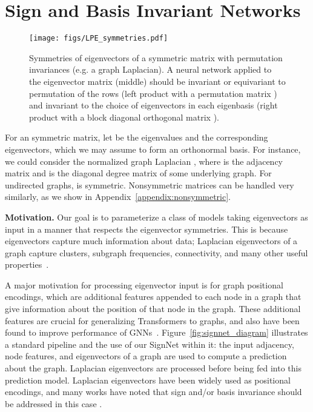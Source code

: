 \documentclass{article} \usepackage{iclr2023_conference,times}
\begin{document}
\section{Sign and Basis Invariant Networks}
\begin{wrapfigure}{r}{0.5\textwidth}
\vspace{-10pt}
\centering
    \texttt{[image: figs/LPE\_symmetries.pdf]}
\caption{Symmetries of eigenvectors of a symmetric matrix with permutation invariances (e.g. a graph Laplacian). A neural network applied to the eigenvector matrix (middle) should be invariant or equivariant to permutation of the rows (left product with a permutation matrix ) and invariant to the choice of eigenvectors in each eigenbasis (right product with a block diagonal orthogonal matrix ).}
\label{fig:symmetries}
\vspace{-15pt}
\end{wrapfigure}

For an  symmetric matrix, let  be the eigenvalues and  the corresponding eigenvectors, which we may assume to form an orthonormal basis. For instance, we could consider the normalized graph Laplacian , where  is the adjacency matrix and  is the diagonal degree matrix  of some underlying graph. For undirected graphs,  is symmetric. Nonsymmetric matrices can be handled very similarly, as we show in Appendix~\ref{appendix:nonsymmetric}.

\textbf{Motivation.} Our goal is to parameterize a class of models   taking  eigenvectors as input in a manner that respects the eigenvector symmetries. 
This is because eigenvectors capture much information about data; Laplacian eigenvectors of a graph capture clusters, subgraph frequencies, connectivity, and many other useful properties~\citep{von2007tutorial, cvetkovic1997eigenspaces}.

A major motivation for processing eigenvector input is for graph positional encodings, which are additional features appended to each node in a graph that give information about the position of that node in the graph. These additional features are crucial for generalizing Transformers to graphs, and also have been found to improve performance of GNNs~\citep{dwivedi2020benchmarking, dwivedi2022graph}. Figure~\ref{fig:signnet_diagram} illustrates a standard pipeline and the use of our SignNet within it: the input adjacency, node features, and eigenvectors of a graph are used to compute a prediction about the graph. Laplacian eigenvectors are processed before being fed into this prediction model. Laplacian eigenvectors have been widely used as positional encodings, and many works have noted that sign and/or basis invariance should be addressed in this case \citep{dwivedi2020generalization, beaini2021directional, dwivedi2020benchmarking, kreuzer2021rethinking, mialon2021graphit, dwivedi2022graph, kim2022pure}.
\end{document}
